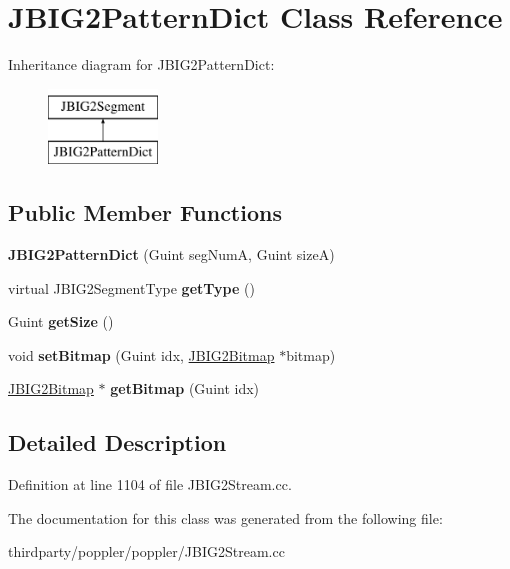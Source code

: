 \hypertarget{class_j_b_i_g2_pattern_dict}{}\section{J\+B\+I\+G2\+Pattern\+Dict Class Reference}
\label{class_j_b_i_g2_pattern_dict}
Inheritance diagram for J\+B\+I\+G2\+Pattern\+Dict\+:\begin{figure}[H]
\begin{center}
\leavevmode
\includegraphics[height=2.000000cm]{class_j_b_i_g2_pattern_dict}
\end{center}
\end{figure}
\subsection*{Public Member Functions}
\begin{DoxyCompactItemize}
\item 
\mbox{\label{class_j_b_i_g2_pattern_dict_aa0bb1cae43994c652974f8bed7860946}} 
{\bfseries J\+B\+I\+G2\+Pattern\+Dict} (Guint seg\+NumA, Guint sizeA)
\item 
\mbox{\label{class_j_b_i_g2_pattern_dict_aa7b6fb9df2fe522e5a7c6ba121b6b748}} 
virtual J\+B\+I\+G2\+Segment\+Type {\bfseries get\+Type} ()
\item 
\mbox{\label{class_j_b_i_g2_pattern_dict_ac5a9593ae972f597faaf33b8f65af9e4}} 
Guint {\bfseries get\+Size} ()
\item 
\mbox{\label{class_j_b_i_g2_pattern_dict_a74a9bb9843d9080bae36f701fe45363d}} 
void {\bfseries set\+Bitmap} (Guint idx, \hyperlink{class_j_b_i_g2_bitmap}{J\+B\+I\+G2\+Bitmap} $\ast$bitmap)
\item 
\mbox{\label{class_j_b_i_g2_pattern_dict_a7a08012d77bc5a30d5a2f150be147fa0}} 
\hyperlink{class_j_b_i_g2_bitmap}{J\+B\+I\+G2\+Bitmap} $\ast$ {\bfseries get\+Bitmap} (Guint idx)
\end{DoxyCompactItemize}


\subsection{Detailed Description}


Definition at line 1104 of file J\+B\+I\+G2\+Stream.\+cc.



The documentation for this class was generated from the following file\+:\begin{DoxyCompactItemize}
\item 
thirdparty/poppler/poppler/J\+B\+I\+G2\+Stream.\+cc\end{DoxyCompactItemize}
